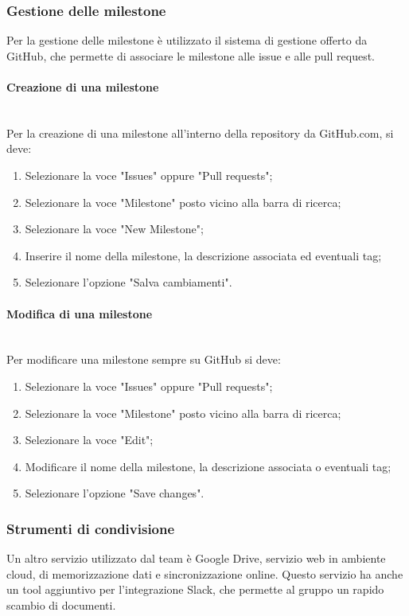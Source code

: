 {\subsubsection{Gestione delle milestone}
Per la gestione delle {milestone} è utilizzato il sistema di gestione offerto da GitHub, che permette di associare le milestone alle issue e alle pull request.
\paragraph{Creazione di una milestone}\mbox{}\\
Per la creazione di una milestone all'interno della repository da GitHub.com, si deve:
\begin{enumerate}
\item Selezionare la voce "Issues" oppure "Pull requests";
\item Selezionare la voce "Milestone" posto vicino alla barra di ricerca;
\item Selezionare la voce "New Milestone";
\item Inserire il nome della milestone, la descrizione associata ed eventuali tag;
\item Selezionare l'opzione "Salva cambiamenti".
\end{enumerate}
\paragraph{Modifica di una milestone}\mbox{}\\
Per modificare una milestone sempre su GitHub si deve:
\begin{enumerate}
\item Selezionare la voce "Issues" oppure "Pull requests";
\item Selezionare la voce "Milestone" posto vicino alla barra di ricerca;
\item Selezionare la voce "Edit";
\item Modificare il nome della milestone, la descrizione associata o eventuali tag;
\item Selezionare l'opzione "Save changes".
\end{enumerate}

\subsubsection{Strumenti di condivisione}
Un altro servizio utilizzato dal team è Google Drive, servizio web in {ambiente cloud}, di memorizzazione dati e sincronizzazione online. Questo servizio ha anche un tool aggiuntivo per l'integrazione Slack, che permette al gruppo un rapido scambio di documenti.
}
